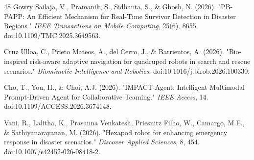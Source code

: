 \documentclass[journal]{IEEEtran}
\begin{document}
\begin{thebibliography}{48}
Gowry Sailaja, V., Pramanik, S., Sidhanta, S., \& Ghosh, N. (2026). "PB-PAPP: An Efficient Mechanism for Real-Time Survivor Detection in Disaster Regions." \textit{IEEE Transactions on Mobile Computing}, 25(6), 8655. doi:10.1109/TMC.2025.3649563.

Cruz Ulloa, C., Prieto Mateos, A., del Cerro, J., \& Barrientos, A. (2026). "Bio-inspired risk-aware adaptive navigation for quadruped robots in search and rescue scenarios." \textit{Biomimetic Intelligence and Robotics}. doi:10.1016/j.birob.2026.100330.

Cho, T., You, H., \& Choi, A.J. (2026). "IMPACT-Agent: Intelligent Multimodal Prompt-Driven Agent for Collaborative Teaming." \textit{IEEE Access}, 14. doi:10.1109/ACCESS.2026.3674148.

Vani, R., Lalitha, K., Prasanna Venkatesh, Priesnitz Filho, W., Camargo, M.E., \& Sathiyanarayanan, M. (2026). "Hexapod robot for enhancing emergency response in disaster scenarios." \textit{Discover Applied Sciences}, 8, 454. doi:10.1007/s42452-026-08418-2.

\end{thebibliography}
\end{document}
